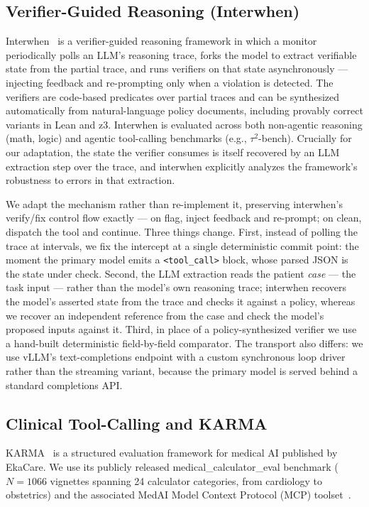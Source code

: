 \subsection{Verifier-Guided Reasoning (Interwhen)}
\label{sec:bg_interwhen}

Interwhen~\citep{bhat2026interwhen} is a verifier-guided reasoning
framework in which a monitor periodically polls an LLM's reasoning
trace, forks the model to extract verifiable state from the partial
trace, and runs verifiers on that state asynchronously --- injecting
feedback and re-prompting only when a violation is detected. The
verifiers are code-based predicates over partial traces and can be
synthesized automatically from natural-language policy documents,
including provably correct variants in Lean and z3. Interwhen is
evaluated across both non-agentic reasoning (math, logic) and agentic
tool-calling benchmarks (e.g., $\tau^2$-bench). Crucially for our
adaptation, the state the verifier consumes is itself recovered by an
LLM extraction step over the trace, and interwhen explicitly analyzes
the framework's robustness to errors in that extraction.

We adapt the mechanism rather than re-implement it, preserving
interwhen's verify/fix control flow exactly --- on flag, inject
feedback and re-prompt; on clean, dispatch the tool and continue.
Three things change. First, instead of polling the trace at intervals,
we fix the intercept at a single deterministic commit point: the
moment the primary model emits a \verb|<tool_call>| block, whose parsed
JSON is the state under check. Second, the LLM extraction reads the
patient \emph{case} --- the task input --- rather than the model's own
reasoning trace; interwhen recovers the model's asserted state from the
trace and checks it against a policy, whereas we recover an independent
reference from the case and check the model's proposed inputs against
it. Third, in place of a policy-synthesized verifier we use a
hand-built deterministic field-by-field comparator. The transport also
differs: we use vLLM's text-completions endpoint with a custom
synchronous loop driver rather than the streaming variant, because the
primary model is served behind a standard completions API.

\subsection{Clinical Tool-Calling and KARMA}
\label{sec:bg_karma}

KARMA~\citep{karma2024} is a structured evaluation framework for medical
AI published by EkaCare. We use its publicly released
medical\_calculator\_eval benchmark ($N=1066$ vignettes spanning 24
calculator categories, from cardiology to obstetrics) and the
associated MedAI Model Context Protocol (MCP)
toolset~\citep{medai_mcp}.

